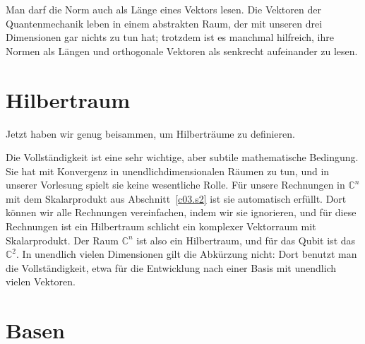 Man darf die Norm auch als Länge eines Vektors lesen. Die Vektoren der Quantenmechanik leben
in einem abstrakten Raum, der mit unseren drei Dimensionen gar nichts zu tun hat; trotzdem ist
es manchmal hilfreich, ihre Normen als Längen und orthogonale Vektoren als senkrecht
aufeinander zu lesen.

\section{Hilbertraum}\label{c03.s6}

Jetzt haben wir genug beisammen, um Hilberträume zu definieren.


Die Vollständigkeit ist eine sehr wichtige, aber subtile mathematische Bedingung. Sie hat mit
Konvergenz in unendlichdimensionalen Räumen zu tun, und in unserer Vorlesung spielt sie keine
wesentliche Rolle. Für unsere Rechnungen in $\mathbb{C}^n$ mit dem Skalarprodukt aus
Abschnitt~\ref{c03.s2} ist sie automatisch erfüllt. Dort können wir alle
Rechnungen vereinfachen, indem wir sie ignorieren, und für diese Rechnungen ist ein
Hilbertraum schlicht ein komplexer Vektorraum mit Skalarprodukt. Der Raum $\mathbb{C}^n$ ist
also ein Hilbertraum, und für das Qubit ist das $\mathbb{C}^2$. In unendlich vielen
Dimensionen gilt die Abkürzung nicht: Dort benutzt man die Vollständigkeit, etwa für die
Entwicklung nach einer Basis mit unendlich vielen Vektoren.

\section{Basen}\label{c03.s7}

